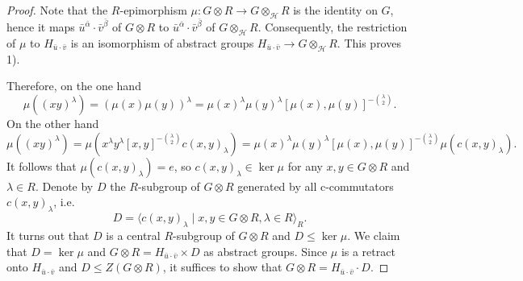 \documentclass[10pt,a4paper]{amsart}
\begin{document}
\begin{proof}
	Note that the $R$-epimorphism $\mu: G\otimes R \to G \otimes_{\mathcal{H}} R$ is the identity on $G$, hence it maps $\bar u^{\bar\alpha} \cdot \bar v^{\bar \beta}$ of $G \otimes R$ to $\bar u^{\bar\alpha} \cdot \bar v^{\bar \beta}$ of $G \otimes_{\mathcal{H}} R$. Consequently, the restriction of $\mu$ to $H_{\bar u \cdot \bar v}$ is an isomorphism of abstract groups $H_{\bar u \cdot \bar v} \to G \otimes_{\mathcal{H}} R$. This proves 1).
	
	
	Therefore, on the one hand
	$$
	\mu((xy)^\lambda) = (\mu(x)\mu(y))^\lambda= \mu(x)^\lambda \mu(y)^\lambda [\mu(x),\mu(y)]^{-\binom{\lambda}{2}}.
	$$
	On the other hand
	$$
	\mu((xy)^\lambda) = \mu(x^\lambda y^\lambda [x,y]^{-\binom{\lambda}{2}} c(x,y)_\lambda)= \mu(x)^\lambda \mu(y)^\lambda [\mu(x),\mu(y)]^{-\binom{\lambda}{2}} \mu(c(x,y)_\lambda).
	$$
	It follows that $\mu(c(x,y)_\lambda) = e$, so $c(x,y)_\lambda \in \ker \mu$ for any $x,y \in G\otimes R$ and $\lambda \in R$.
    Denote by $D$ the $R$-subgroup of $G \otimes R$ generated by all c-commutators $c(x,y)_\lambda$, i.e.
	$$
	D = \langle c(x,y)_\lambda \mid x,y \in G\otimes R, \lambda \in R\rangle_R.
	$$
	It turns out that $D$ is a central $R$-subgroup of $G \otimes R$ and $D \leq \ker \mu$.
    We claim that $D = \ker \mu$ and $G\otimes R = H_{\bar u \cdot \bar v} \times D$ as abstract groups. Since $\mu$ is a retract onto $H_{\bar u \cdot \bar v}$ and $D \leq Z(G\otimes R)$, it suffices to show that $G\otimes R = H_{\bar u \cdot \bar v}\cdot D$.
	

\end{proof}
\end{document}
